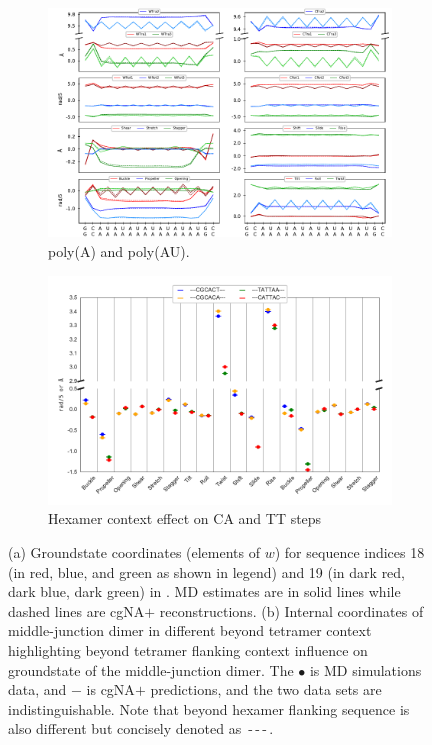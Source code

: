 \begin{figure}[H]
  \begin{subfigure}{15cm}
    \centering\includegraphics[scale=1]{images/RNA_compare_seq_18_19.pdf}
    \centering\caption{poly(A) and poly(AU).}
  \end{subfigure} 

  \begin{subfigure}{15cm}
    \centering\includegraphics{./Xray_images/hex_context_effect.pdf}
    \centering\caption{Hexamer context effect on CA and TT steps}
  \end{subfigure}
\centering\caption{(a) Groundstate coordinates (elements of $w$) for sequence indices 18 (in red, blue, and green as shown in legend) and 19 (in dark red, dark blue, dark green) in \Lbrna. MD estimates are in solid lines while dashed lines are cgNA$+$ reconstructions.
(b) Internal coordinates of middle-junction dimer in different beyond tetramer context highlighting beyond tetramer flanking context influence on groundstate of the middle-junction dimer.
The $\bullet$ is MD simulations data, and $-$ is cgNA$+$ predictions, and the two data sets are indistinguishable. 
Note that beyond hexamer flanking sequence is also different but concisely denoted as \,-\,-\,-\,.
}
\label{c4:figure1_rna}
\end{figure}

